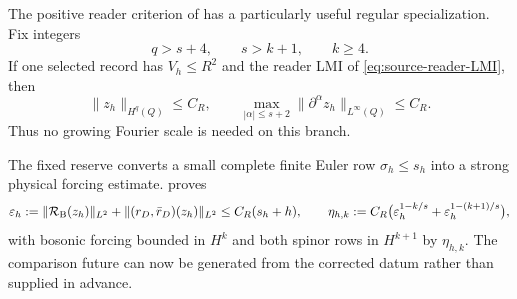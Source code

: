 \documentclass[11pt]{article}
\numberwithin{equation}{section}
\theoremstyle{definition}
\theoremstyle{remark}
\newcommand{\norm}[1]{\lVert#1\rVert}
\begin{document}
The positive reader criterion of  has a
particularly useful regular specialization.  Fix integers
\begin{equation}
 q>s+4,
 \qquad s>k+1,
 \qquad k\ge4.
 \label{eq:shadow-regularity-indices}
\end{equation}
If one selected record has $V_h\le R^2$ and the reader LMI of
\eqref{eq:source-reader-LMI}, then
\begin{equation}
 \norm{z_h}_{H^q(Q)}\le C_R,
 \qquad
 \max_{|\alpha|\le s+2}\norm{\partial^\alpha z_h}_{L^\infty(Q)}\le C_R.
 \label{eq:shadow-reader-reserve}
\end{equation}
Thus no growing Fourier scale is needed on this branch.

The fixed reserve converts a small complete finite Euler row
$\sigma_h\le s_h$ into a strong physical forcing estimate.
 proves
\[
 \varepsilon_h:=\|\mathcal R_{\rm B}(z_h)\|_{L^2}
       +\|(r_D,\bar r_D)(z_h)\|_{L^2}\le C_R(s_h+h),
 \qquad
 \eta_{h,k}:=C_R\bigl(\varepsilon_h^{1-k/s}
       +\varepsilon_h^{1-(k+1)/s}\bigr),
\]
with bosonic forcing bounded in $H^k$ and both spinor rows in $H^{k+1}$
by $\eta_{h,k}$. The comparison future can now be generated from the
corrected datum rather than supplied in advance.
\end{document}
